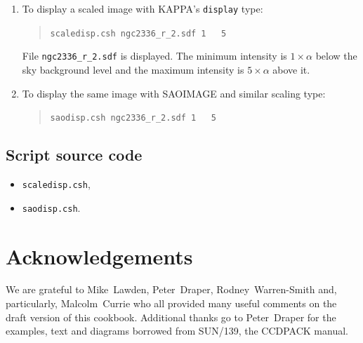 \documentclass[twoside,11pt]{article}
\newcommand{\htmladdnormallink}[2]{#1}
\newcommand{\xref}[3]{#1}
\begin{document}
\begin{enumerate}

  \item To display a scaled image with KAPPA's {\tt display} type:

  \begin{quote}
   {\tt scaledisp.csh ngc2336\_r\_2.sdf 1 ~ 5}
  \end{quote}

   File {\tt ngc2336\_r\_2.sdf} is displayed.  The minimum intensity is
   $1 \times \alpha$ below the sky background level and the maximum
   intensity is $5 \times \alpha$ above it.

  \item To display the same image with SAOIMAGE and similar scaling type:

  \begin{quote}
   {\tt saodisp.csh ngc2336\_r\_2.sdf 1 ~ 5}
  \end{quote}

\end{enumerate}

\begin{htmlonly}

\subsection*{Script source code}

\begin{itemize}

  \item \htmladdnormallink{{\tt scaledisp.csh}}{scaledisp.lis},

  \item \htmladdnormallink{{\tt saodisp.csh}}{saodisp.lis}.

\end{itemize}

\end{htmlonly}


\newpage
{}
\section*{Acknowledgements}

We are grateful to Mike~Lawden, Peter~Draper, Rodney~Warren-Smith and,
particularly, Malcolm~Currie who all provided many useful comments on the
draft version of this cookbook.  Additional thanks go to Peter~Draper for
the examples, text and diagrams borrowed from \xref{SUN/139}{sun139}{}, the
CCDPACK manual.
\end{document}
